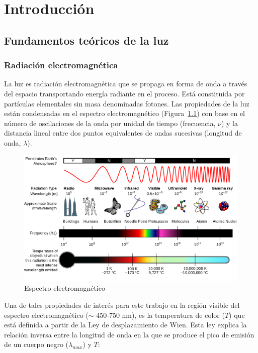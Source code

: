 \chapter{Introducción}


\section{Fundamentos teóricos de la luz}

\subsection{Radiación electromagnética}

La luz es radiación electromagnética que se propaga en forma de onda a través del espacio transportando energía radiante en el proceso. Está constituida por partículas elementales sin masa denominadas fotones.
Las propiedades de la luz están condensadas en el espectro electromagnético (Figura~\ref{espectroelectromagnetico}) con base en el número de oscilaciones de la onda por unidad de tiempo (frecuencia, $\nu$) y la distancia lineal entre dos puntos equivalentes de ondas sucesivas (longitud de onda, $\lambda$).\\

\begin{figure}
  \centering
    \includegraphics[width=1\textwidth]{espectroelectromagnetico}
  \caption{Espectro electromagnético \citep{NASA2007}}
  \label{espectroelectromagnetico}
\end{figure}

Una de tales propiedades de interés para este trabajo en la región visible del espectro electromagnético ($\sim$ 450-750 nm), es la temperatura de color ($T$)  que está definida a partir de la Ley de desplazamiento de Wien. Esta ley explica la relación inversa entre la longitud de onda en la que se produce el pico de emisión de un cuerpo negro ($\lambda_{max}$) y $T$:

